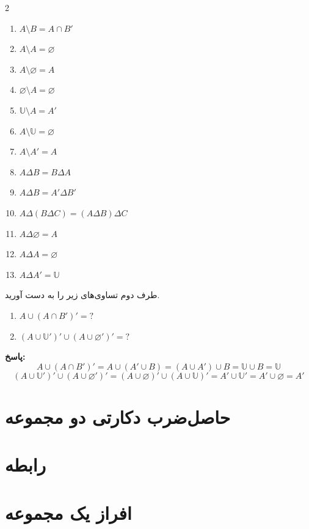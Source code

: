\begin{theorem}
\begin{multicols}{2}
\begin{enumerate}
			$(A \cap B)' = A' \cup B'$
			\item 
			$A \setminus B = A \cap B'$
			\item 
			$A \setminus A = \varnothing$
			\item 
			$A \setminus \varnothing = A$
			\item 
			$\varnothing \setminus A = \varnothing$
			\item 
			$\mathbb{U} \setminus A = A'$
			\item 
			$A \setminus \mathbb{U} = \varnothing$
			\item 
			$A \setminus A' = A$
			\item 
			$A \Delta B = B \Delta A$
			\item 
			$A \Delta B = A' \Delta B'$
			\item 
			$A \Delta (B \Delta C) = (A \Delta B) \Delta C$
			\item 
			$A \Delta \varnothing = A$
			\item 
			$A \Delta A = \varnothing$
			\item 
			$A \Delta A' = \mathbb{U}$
		\end{enumerate}
	\end{multicols}
\end{theorem}

\begin{example}
	طرف دوم تساوی‌های زیر را به دست آورید.
	\begin{enumerate}
		\item 
		$A \cup (A \cap B')' = ?$
		\item 
		$(A \cup \mathbb{U}')' \cup (A \cup \varnothing')' = ?$
	\end{enumerate}
	\textbf{پاسخ:}
	$$A \cup (A \cap B')' = A \cup (A' \cup B) = (A \cup A') \cup B = \mathbb{U} \cup B = \mathbb{U}$$
	$$(A \cup \mathbb{U}')' \cup (A \cup \varnothing')' = (A \cup \varnothing)' \cup (A \cup \mathbb{U})' = A' \cup \mathbb{U}' = A' \cup \varnothing = A'$$
\end{example}

\section{حاصل‌ضرب دکارتی دو مجموعه}

\section{رابطه}

\section{افراز یک مجموعه}


